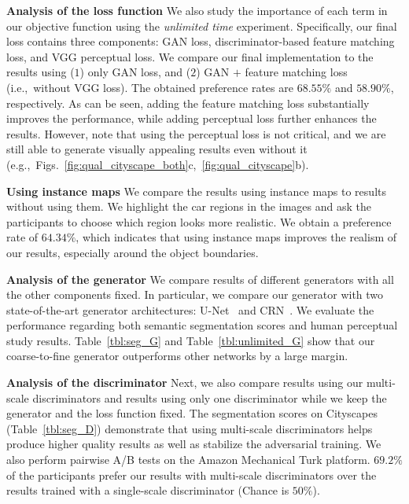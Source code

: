 \documentclass[10pt,twocolumn,letterpaper]{article}
\newcommand{\reftbl}[1]{Table~\ref{tbl:#1}}
\begin{document}
\vspace{.03in}
{\noindent \bf Analysis of the loss function} We also study the importance of each term in our objective function using the \textit{unlimited time}  experiment.
Specifically, our final loss contains three components: GAN loss, discriminator-based feature matching loss, and VGG perceptual loss. We compare our final implementation to the results using ($1$) only GAN loss, and ($2$) GAN $+$ feature matching loss (i.e.,\ without VGG loss). The obtained preference rates are $68.55\%$ and $58.90\%$, respectively.
As can be seen, adding the feature matching loss substantially improves the performance, while adding perceptual loss further enhances the results. However, note that using the perceptual loss is not critical, and we are still able to generate visually appealing results even without it (e.g.,\ Figs.~\ref{fig:qual_cityscape_both}c,~\ref{fig:qual_cityscape}b). 

\vspace{.03in}
{\noindent \bf Using instance maps} We compare the results using instance maps to results without using them. We highlight the car regions in the images and ask the participants to choose which region looks more realistic. We obtain a preference rate of $64.34\%$, which indicates that using instance maps improves the realism of our results, especially around the object boundaries.

\vspace{.03in}
{\noindent \bf Analysis of the generator } 
We compare results of different generators with all the other components fixed. In particular, we compare our generator with two state-of-the-art generator architectures: U-Net~\cite{ronneberger2015u,isola2016image} and CRN~\cite{chen2017photographic}. We evaluate the performance regarding both semantic segmentation scores and human perceptual study results. \reftbl{seg_G} and \reftbl{unlimited_G} show that our coarse-to-fine generator outperforms other networks by a large margin.

\vspace{.03in}
{\noindent \bf Analysis of the discriminator } 
Next, we also compare results using our multi-scale discriminators and results using only one discriminator while we keep the generator and the loss function fixed. The segmentation scores on Cityscapes~\cite{Cordts2016cityscapes} (\reftbl{seg_D}) demonstrate that using multi-scale discriminators helps produce higher quality results as well as stabilize the adversarial training. We also perform pairwise A/B tests on the Amazon Mechanical Turk platform. $69.2\%$ of the participants prefer our results with multi-scale discriminators over the results trained with a single-scale discriminator (Chance is $50\%$).
\end{document}
